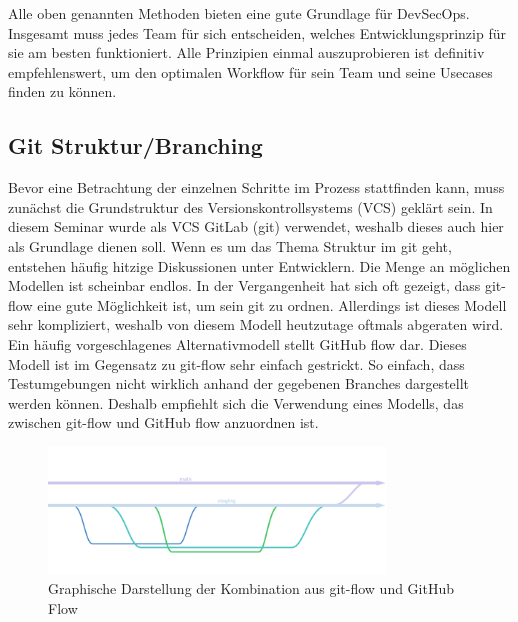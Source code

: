 Alle oben genannten Methoden bieten eine gute Grundlage für DevSecOps.
Insgesamt muss jedes Team für sich entscheiden, welches Entwicklungsprinzip für sie am besten funktioniert.
Alle Prinzipien einmal auszuprobieren ist definitiv empfehlenswert, um den optimalen Workflow für sein Team und seine Usecases finden zu können.

\subsection{Git Struktur/Branching}

Bevor eine Betrachtung der einzelnen Schritte im Prozess stattfinden kann, muss zunächst die Grundstruktur des Versionskontrollsystems (VCS) geklärt sein.
In diesem Seminar wurde als VCS GitLab (git) verwendet, weshalb dieses auch hier als Grundlage dienen soll.
Wenn es um das Thema Struktur im git geht, entstehen häufig hitzige Diskussionen unter Entwicklern.
Die Menge an möglichen Modellen ist scheinbar endlos.
In der Vergangenheit hat sich oft gezeigt, dass git-flow\cite{SuccessfulGitBranching} eine gute Möglichkeit ist, um sein git zu ordnen.
Allerdings ist dieses Modell sehr kompliziert, weshalb von diesem Modell heutzutage oftmals abgeraten wird.
Ein häufig vorgeschlagenes Alternativmodell stellt GitHub flow\cite{UnderstandingGitHubFlow} dar.
Dieses Modell ist im Gegensatz zu git-flow sehr einfach gestrickt.
So einfach, dass Testumgebungen nicht wirklich anhand der gegebenen Branches dargestellt werden können.
Deshalb empfiehlt sich die Verwendung eines Modells, das zwischen git-flow und GitHub flow anzuordnen ist.
\begin{figure}[H]
    \includegraphics[width=0.8\textwidth]{img/branching}
    \centering
    \caption{Graphische Darstellung der Kombination aus git-flow und GitHub Flow}
    \label{fig:branchingModel}
\end{figure}

